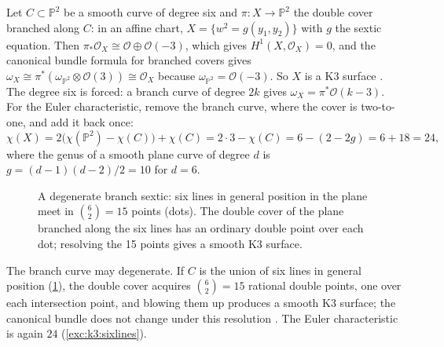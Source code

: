 Let $C\subset\mathbb{P}^2$ be a smooth curve of degree six and $\pi:X\to\mathbb{P}^2$ the double
cover branched along $C$: in an affine chart, $X=\{w^2=g(y_1,y_2)\}$ with $g$ the sextic
equation. Then $\pi_*\mathcal{O}_X\cong\mathcal{O}\oplus\mathcal{O}(-3)$, which gives
$H^1(X,\mathcal{O}_X)=0$, and the canonical bundle formula for branched covers gives
$\omega_X\cong\pi^*(\omega_{\mathbb{P}^2}\otimes\mathcal{O}(3))\cong\mathcal{O}_X$ because
$\omega_{\mathbb{P}^2}=\mathcal{O}(-3)$. So $X$ is a K3 surface \TL{} . The degree six is forced: a branch curve of degree $2k$ gives
$\omega_X=\pi^*\mathcal{O}(k-3)$. For the Euler characteristic, remove the branch curve, where
the cover is two-to-one, and add it back once:
\begin{equation}\label{eq:k3:doubleplane}
  \chi(X)=2\big(\chi(\mathbb{P}^2)-\chi(C)\big)+\chi(C)=2\cdot3-\chi(C)=6-(2-2g)=6+18=24,
\end{equation}
where the genus of a smooth plane curve of degree $d$ is $g=(d-1)(d-2)/2=10$ for $d=6$.

\begin{figure}[t]
\centering
{}
\caption{A degenerate branch sextic: six lines in general position in the plane meet in
$\binom62=15$ points (dots). The double cover of the plane branched along the six lines has an
ordinary double point over each dot; resolving the 15 points gives a smooth K3 surface.}
\label{fig:k3:sixlines}
\end{figure}

The branch curve may degenerate. If $C$ is the union of six lines in general position
(\cref{fig:k3:sixlines}), the double cover acquires $\binom62=15$ rational double points, one
over each intersection point, and blowing them up produces a smooth K3 surface; the canonical
bundle does not change under this resolution .
The Euler characteristic is again $24$ (\cref{exc:k3:sixlines}).

